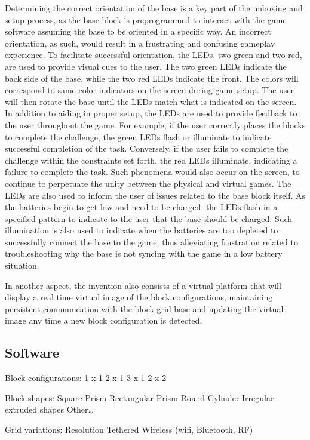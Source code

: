 \documentclass[]{article}
\begin{document}
Determining the correct orientation of the base is a key part of the unboxing and setup process, as the base block is preprogrammed to interact with the game software assuming the base to be oriented in a specific way.  An incorrect orientation, as such, would result in a frustrating and confusing gameplay experience.   To facilitate successful orientation, the LEDs, two green and two red, are used to provide visual cues to the user.  The two green LEDs indicate the back side of the base, while the two red LEDs indicate the front.  The colors will correspond to same-color indicators on the screen during game setup.  The user will then rotate the base until the LEDs match what is indicated on the screen.
In addition to aiding in proper setup, the LEDs are used to provide feedback to the user throughout the game.  For example, if the user correctly places the blocks to complete the challenge, the green LEDs flash or illuminate to indicate successful completion of the task.  Conversely, if the user fails to complete the challenge within the constraints set forth, the red LEDs illuminate, indicating a failure to complete the task.  Such phenomena would also occur on the screen, to continue to perpetuate the unity between the physical and virtual games.
The LEDs are also used to inform the user of issues related to the base block itself.  As the batteries begin to get low and need to be charged, the LEDs flash in a specified pattern to indicate to the user that the base should be charged.  Such illumination is also used to indicate when the batteries are too depleted to successfully connect the base to the game, thus alleviating frustration related to troubleshooting why the base is not syncing with the game in a low battery situation.

In another aspect, the invention also consists of a virtual platform that will display a real time virtual image of the block configurations, maintaining persistent communication with the block grid base and updating the virtual image any time a new block configuration is detected.

\subsection{Software}

Block configurations:
1 x 1
2 x 1
3 x 1
2 x 2

Block shapes:
Square Prism
Rectangular Prism
Round Cylinder
Irregular extruded shapes
Other…

Grid variations:
Resolution
Tethered
Wireless (wifi, Bluetooth, RF)
\end{document}
